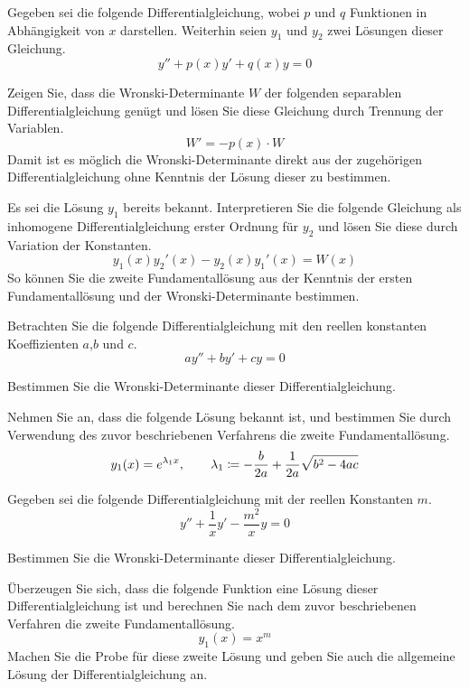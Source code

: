 \begin{atiTask}[
	title = Die Wronski-Determinante,
	lecture = Mathematische Methoden der Physik I,
	topic = Gewöhnliche Differentialgleichungen,
	subtopic = Die lineare homogene Differentialgleichung 2. Ordnung mit konstanten Koeffizienten,
	language = Deutsch
]
	Gegeben sei die folgende Differentialgleichung, wobei $p$ und $q$ Funktionen in Abhängigkeit von $x$ darstellen.
	Weiterhin seien $y_1$ und $y_2$ zwei Lösungen dieser Gleichung.
	\[
		y'' + p(x)y' + q(x)y = 0
	\]
	\begin{atiSubtasks}
		\item{
			Zeigen Sie, dass die Wronski-Determinante $W$ der folgenden separablen Differentialgleichung genügt und lösen Sie diese Gleichung durch Trennung der Variablen.
			\[
				W' = -p(x)\cdot W
			\]
			Damit ist es möglich die Wronski-Determinante direkt aus der zugehörigen Differentialgleichung ohne Kenntnis der Lösung dieser zu bestimmen.
		}
		\item{
			Es sei die Lösung $y_1$ bereits bekannt.
			Interpretieren Sie die folgende Gleichung als inhomogene Differentialgleichung erster Ordnung für $y_2$ und lösen Sie diese durch Variation der Konstanten.
			\[
				y_1(x)y_2'(x)-y_2(x)y_1'(x) = W(x)
			\]
			So können Sie die zweite Fundamentallösung aus der Kenntnis der ersten Fundamentallösung und der Wronski-Determinante bestimmen.
		}
		\item{
			Betrachten Sie die folgende Differentialgleichung mit den reellen konstanten Koeffizienten $a$,$b$ und $c$.
			\[
				ay'' + by' + cy = 0
			\]
			\begin{atiSubsubtasks}
				\item{
					Bestimmen Sie die Wronski-Determinante dieser Differentialgleichung.
				}
				\item{
					Nehmen Sie an, dass die folgende Lösung bekannt ist, und bestimmen Sie durch Verwendung des zuvor beschriebenen Verfahrens die zweite Fundamentallösung.
					\[
						y_1(x) = e^{\lambda_1 x} ,\qquad \lambda_1 \coloneqq -\frac{b}{2a} + \frac{1}{2a}\sqrt{b^2-4ac}
					\]
				}
			\end{atiSubsubtasks}
		}
		\item{
			Gegeben sei die folgende Differentialgleichung mit der reellen Konstanten $m$.
			\[
				y'' + \frac{1}{x} y' - \frac{m^2}{x}y = 0
			\]
			\begin{atiSubsubtasks}
				\item{
					Bestimmen Sie die Wronski-Determinante dieser Differentialgleichung.
				}
				\item{
					Überzeugen Sie sich, dass die folgende Funktion eine Lösung dieser Differentialgleichung ist und berechnen Sie nach dem zuvor beschriebenen Verfahren die zweite Fundamentallösung.
					\[
						y_1(x) = x^m
					\]
					Machen Sie die Probe für diese zweite Lösung und geben Sie auch die allgemeine Lösung der Differentialgleichung an.
				}
			\end{atiSubsubtasks}
		}
	\end{atiSubtasks}
\end{atiTask}